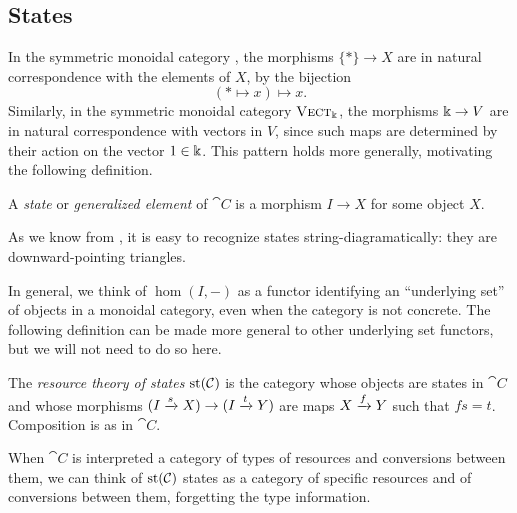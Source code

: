 \subsection{States}

In the symmetric monoidal category , the morphisms $\{*\}\to X$
are in natural correspondence with the elements of $X$, by the bijection \[
  (*\mapsto x) \mapsto x.
\]
Similarly, in the symmetric monoidal category ${\textsc{\text{Vect}}}_\Bbbk$, the morphisms
$\Bbbk\to V$ are in natural correspondence with vectors in $V$, since such maps
are determined by their action on the vector $1\in\Bbbk$. This pattern holds more
generally, motivating the following definition.

\begin{dfn}[state]
  A \emph{state} or \emph{generalized element} of $\cat{C}$ is a morphism $I\to
  X$ for some object $X$.
\end{dfn}

As we know from ,
it is easy to recognize states string-diagramatically: they are
downward-pointing triangles.

In general, we think of $\hom(I, -)$ as a functor identifying an ``underlying
set'' of objects in a monoidal category, even when the category is not concrete.
The following definition can be made more general to other underlying set
functors, but we will not need to do so here.

\begin{dfn}
  The \emph{resource theory of states} $\operatorname*{st}({\mathcal{C}})$ is the category whose objects
  are states in $\cat{C}$ and whose morphisms $(I\xrightarrow{s}X)\to (I\xrightarrow{t}Y)$ are
  maps $X\xrightarrow{f} Y$ such that $fs = t$. Composition is as in $\cat{C}$.
\end{dfn}

When $\cat{C}$ is interpreted a category of types of resources and conversions
between them, we can think of $\operatorname*{st}({\mathcal{C}})$ states as a category
of specific resources and of conversions between them, forgetting the type
information.

